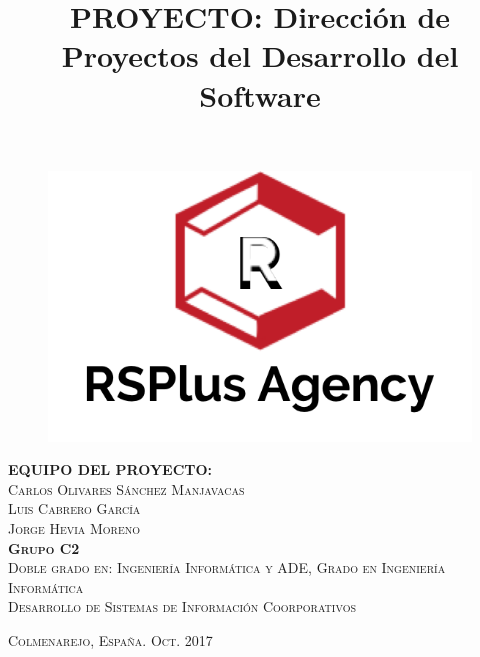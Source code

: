 \title{PROYECTO: Dirección de Proyectos del Desarrollo del Software} %

\begin{titlingpage}
\begin{center}

\begin{figure}[h]

\begin{center}
\includegraphics[width=1\textwidth]{./img/long_logo.png}
\end{center}
\end{figure}

\vfill

\textsc{\LARGE \textbf{EQUIPO DEL PROYECTO:}}\\[2em]
\textsc{\Large Carlos Olivares Sánchez Manjavacas}\\[1em]
\textsc{\Large Luis Cabrero García}\\[1em]
\textsc{\Large Jorge Hevia Moreno}\\[10em]

\textsc{\large \textbf{Grupo C2}}\\[1em]

\textsc{Doble grado en: Ingeniería Informática y ADE, Grado en Ingeniería Informática}\\[1em]

\textsc{Desarrollo de Sistemas de Información Coorporativos}\\[6em]


\end{center}

\textsc{Colmenarejo, España. \hspace*{\fill} Oct. 2017}


\end{titlingpage}
